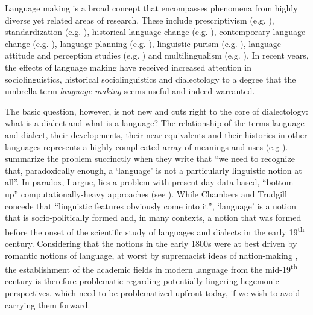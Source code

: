 \documentclass[output=paper]{langscibook}
\begin{document}
\begin{sloppypar}
Language making is a broad concept that encompasses phenomena from highly diverse yet related areas of research. These include prescriptivism (e.g. \citealt{BealEtAl2023,ChapmanRawlins2020}), standardization (e.g. \citealt{Ayres-BennettBellamy2021,Hickey2012}), historical language change (e.g. \citealt{Watts2011,Wright2020}), contemporary language change (e.g. \citealt{MaegaardEtAl2020,GrondelaersHout2011}), language planning (e.g. \citealt{JosephEtAl2020,Fishman2006}), linguistic purism (e.g. \citealt{LangerDavies2005,DeumertVandenbussche2003}), language attitude and perception studies (e.g. \citealt{Kircher2012,DeCilliaRansmayr2019}) and multilingualism (e.g. \citealt{Ayres-BennettFisher2022,Blommaert2008}). In recent years, the effects of language making have received increased attention in sociolinguistics, historical sociolinguistics and dialectology to a degree that the umbrella term \textit{language making} seems useful and indeed warranted.
\end{sloppypar}

The basic question, however, is not new and cuts right to the core of dialectology: what is a dialect and what is a language? The relationship of the terms language and dialect, their developments, their near-equivalents and their histories in other languages represents a highly complicated array of meanings and uses (e.g \citealt{VanRooy2020,Moschonas2004,Maxwell2022}). \citet[4]{ChambersTrudgill1998} summarize the problem succinctly when they write that “we need to recognize that, paradoxically enough, a ‘language’ is not a particularly linguistic notion at all”. In  paradox, I argue, lies a problem with present-day data-based, “bottom-up” computationally-heavy approaches (see \citealt[72--76]{Dollinger2019c}). While Chambers and Trudgill concede that “linguistic features obviously come into it”, ‘language’ is a notion that is socio-politically formed and, in many contexts, a notion that was formed before the onset of the scientific study of languages and dialects in the early 19\textsuperscript{th} century. Considering that the notions in the early 1800s were at best driven by romantic notions of language, at worst by supremacist ideas of nation-making \citep{Hutton1999}, the establishment of the academic fields in modern language from the mid-19\textsuperscript{th} century is therefore problematic regarding potentially lingering hegemonic perspectives, which need to be problematized upfront today, if we wish to avoid carrying them forward.
\end{document}
